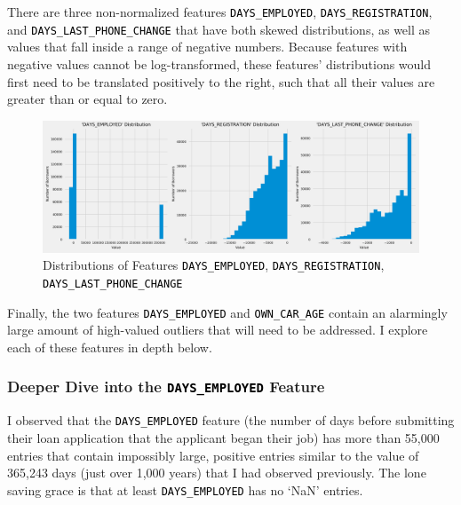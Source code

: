 \documentclass[12pt, letterpaper]{article}
\begin{document}
There are three non-normalized features \colorbox{backcolor}{\textcolor{black}{\texttt{DAYS_EMPLOYED}}}, \colorbox{backcolor}{\textcolor{black}{\texttt{DAYS_REGISTRATION}}}, and \colorbox{backcolor}{\textcolor{black}{\texttt{DAYS_LAST_PHONE_CHANGE}}} that have both skewed distributions, as well as values that fall inside a range of negative numbers. Because features with negative values cannot be log-transformed, these features' distributions would first need to be translated positively to the right, such that all their values are greater than or equal to zero.

\begin{figure}[h!]
\includegraphics[width=\textwidth]{distribsDAYSEMPLOYEDDAYSREGISTRATIONDAYSLASTPHONECHANGE}
\centering
\caption{Distributions of Features \colorbox{backcolor}{\textcolor{black}{\texttt{DAYS_EMPLOYED}}}, \colorbox{backcolor}{\textcolor{black}{\texttt{DAYS_REGISTRATION}}}, \colorbox{backcolor}{\textcolor{black}{\texttt{DAYS_LAST_PHONE_CHANGE}}}}
\end{figure}

Finally, the two features \colorbox{backcolor}{\textcolor{black}{\texttt{DAYS_EMPLOYED}}} and \colorbox{backcolor}{\textcolor{black}{\texttt{OWN_CAR_AGE}}} contain an alarmingly large amount of high-valued outliers that will need to be addressed. I explore each of these features in depth below.

\subsubsection{Deeper Dive into the \colorbox{backcolor}{\textcolor{black}{\texttt{DAYS_EMPLOYED}}} Feature}
I observed that the \colorbox{backcolor}{\textcolor{black}{\texttt{DAYS_EMPLOYED}}} feature (the number of days before submitting their loan application that the applicant began their job) has more than 55,000 entries that contain impossibly large, positive entries similar to the value of 365,243 days (just over 1,000 years) that I had observed previously. The lone saving grace is that at least \colorbox{backcolor}{\textcolor{black}{\texttt{DAYS_EMPLOYED}}} has no `NaN' entries.
\end{document}
